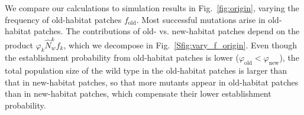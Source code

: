 \documentclass[11pt]{article}
\newcommand{\chg}[1]{\textcolor{change}{#1}}
\begin{document}
We compare our calculations to simulation results in Fig.~\ref{fig:origin}, varying the frequency of old-habitat patches $f_{\text{old}}$. Most successful mutations arise in old-habitat patches. The contributions of old- vs. new-habitat patches depend on the product $\varphi_{k} \widehat{N}_w^k f_k$, which we decompose in Fig.~\ref{Sfig:vary_f_origin}. Even though the establishment probability from old-habitat patches is lower ($\varphi_{\text{old}} < \varphi_{\text{new}}$), the total population size of the wild type in the old-habitat patches is larger than that in new-habitat patches, so that more mutants appear in old-habitat patches than in new-habitat patches, which compensate their lower establishment probability.

\end{document}
